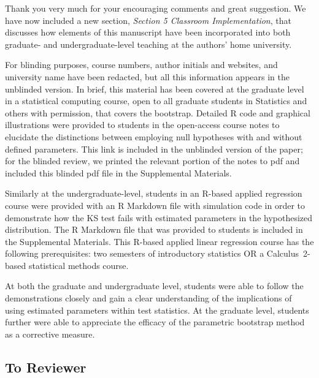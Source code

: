 \documentclass[12pt]{article}
\newcommand{\eds}[1]{\textcolor{blue}{(EDS: #1)}}
\begin{document}
Thank you very much for your encouraging comments and great suggestion.  
We have now included a new section, \textit{Section 5 Classroom Implementation},
that discusses how elements of this manuscript have been incorporated into both 
graduate- and undergraduate-level teaching at the authors' home university. 
 

For blinding purposes, course numbers, author initials and websites, and 
university name have been redacted, but all this information appears in the 
unblinded version.  In brief, this material has been covered at the graduate
level in a statistical computing course, open to all graduate students in 
Statistics and others with permission, that covers the bootstrap. Detailed R 
code and graphical illustrations were provided to students in the open-access 
course notes to elucidate the distinctions between employing null
hypotheses with and without defined parameters.  This link is included in the 
unblinded version of the paper; for the blinded review, we printed the 
relevant portion of the notes to pdf and included this blinded pdf file in the 
Supplemental Materials. %


Similarly at the undergraduate-level, students in an R-based applied regression 
course were provided with an R Markdown file with simulation code in order to 
demonstrate how the KS test fails with estimated parameters in the hypothesized 
distribution. The R Markdown file that was provided to students is included in 
the Supplemental Materials. This R-based applied linear regression course 
has the following prerequisites: two semesters of introductory statistics OR a 
Calculus~2-based statistical methods course.


At both the graduate and undergraduate level, students were able to follow the 
demonstrations closely and gain a clear understanding of the implications of 
using estimated parameters within test statistics.  At the graduate level, 
students further were able to appreciate the efficacy of the parametric 
bootstrap method as a corrective measure.



\subsection*{To Reviewer}
\end{document}
